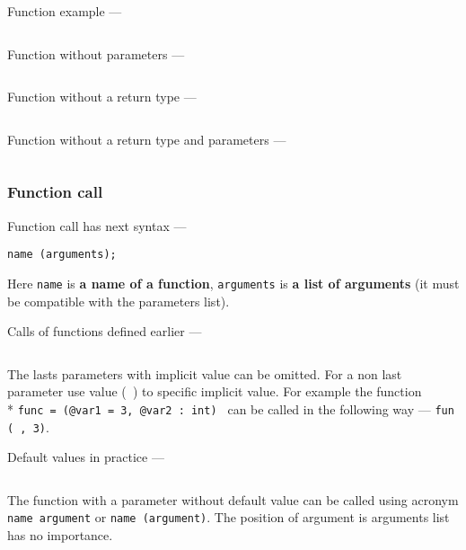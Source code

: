 Function example —
\inputminted[linenos]{icl}{../sources/fullfunc.icL}

Function without parameters —
\inputminted[linenos]{icl}{../sources/noargsfunc.icL}

\newpage
Function without a return type —
\inputminted[linenos]{icl}{../sources/notypefunc.icL}

Function without a return type and parameters —
\inputminted[linenos]{icl}{../sources/minfunc.icL}

\subsubsection{Function call}

Function call has next syntax —
\begin{verbatim}
name (arguments);
\end{verbatim}
Here \texttt{name} is {\bf a name of a function}, \texttt{arguments} is {\bf a list of arguments} (it must be compatible with the parameters list).

Calls of functions defined earlier —
\inputminted[linenos]{icl}{../sources/callfunc.icL}

The lasts parameters with implicit value can be omitted. For a non last parameter use \void{} value (\texttt{~}) to specific implicit value. For example the function \\* \texttt{func = (@var1 = 3, @var2 : int) {}} can be called in the following way — \texttt{fun (~, 3)}.

Default values in practice —
\inputminted[linenos]{icl}{../sources/defaultparametrs.icL}

The function with a parameter without default value can be called using acronym \texttt{name argument} or \texttt{name (argument)}. The position of argument is arguments list has no importance.
